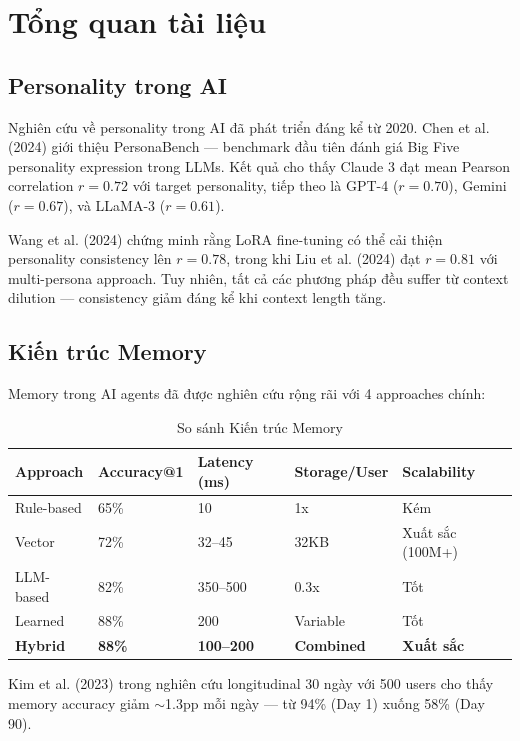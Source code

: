 \section{Tổng quan tài liệu}

\subsection{Personality trong AI}

Nghiên cứu về personality trong AI đã phát triển đáng kể từ 2020. Chen et al. (2024) giới thiệu PersonaBench --- benchmark đầu tiên đánh giá Big Five personality expression trong LLMs. Kết quả cho thấy Claude 3 đạt mean Pearson correlation $r=0.72$ với target personality, tiếp theo là GPT-4 ($r=0.70$), Gemini ($r=0.67$), và LLaMA-3 ($r=0.61$).

Wang et al. (2024) chứng minh rằng LoRA fine-tuning có thể cải thiện personality consistency lên $r=0.78$, trong khi Liu et al. (2024) đạt $r=0.81$ với multi-persona approach. Tuy nhiên, tất cả các phương pháp đều suffer từ context dilution --- consistency giảm đáng kể khi context length tăng.

\subsection{Kiến trúc Memory}

Memory trong AI agents đã được nghiên cứu rộng rãi với 4 approaches chính:

\begin{table}[H]
\centering
\caption{So sánh Kiến trúc Memory}
\label{tab:memory-arch}
\begin{tabular}{lllll}
\toprule
\textbf{Approach} & \textbf{Accuracy@1} & \textbf{Latency (ms)} & \textbf{Storage/User} & \textbf{Scalability} \\
\midrule
Rule-based & 65\% & 10 & 1x & Kém \\
Vector & 72\% & 32--45 & 32KB & Xuất sắc (100M+) \\
LLM-based & 82\% & 350--500 & 0.3x & Tốt \\
Learned & 88\% & 200 & Variable & Tốt \\
\textbf{Hybrid} & \textbf{88\%} & \textbf{100--200} & \textbf{Combined} & \textbf{Xuất sắc} \\
\bottomrule
\end{tabular}
\end{table}

Kim et al. (2023) trong nghiên cứu longitudinal 30 ngày với 500 users cho thấy memory accuracy giảm $\sim$1.3pp mỗi ngày --- từ 94\% (Day 1) xuống 58\% (Day 90).


